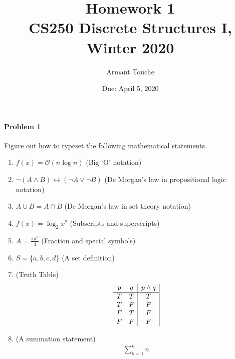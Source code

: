 \documentclass[11pt, a4paper]{article}
\title{\bf Homework 1\\[1ex]
\rm\normalsize CS250 Discrete Structures I, Winter 2020 }
\date{\normalsize Due: April 5, 2020}
\author{\normalsize Armant Touche}
\begin{document}
 

\vspace{0cm}\maketitle 

\paragraph{Problem 1} Figure out how to typeset the following mathematical statements.

\begin{enumerate}

    \item $f(x) =  \mathcal{O}(n \log n)$ (Big `O' notation)

    \item $\neg(A \land B) \leftrightarrow (\neg A \lor \neg B)$ (De Morgan's law in propositional logic notation)

    \item $\overline{A \cup B} = \overline{A} \cap \overline{B}$ (De Morgan's law in set theory notation)

    \item $f(x) = \log_{2} x^{2}$ (Subscripts and superscripts)

    \item $A = \frac{\pi d^2}{4}$ (Fraction and special symbols)

    \item $S = \{a, b, c, d\}$ (A set definition)

    \item (Truth Table)
        \begin{align*} 
			\begin{array}{|c c|c|} 
			p & q & p \land q\\ 
			\hline 			
            T & T & T\\
			T & F & F\\
			F & T & F\\
			F & F & F\\
			\end{array}
        \end{align*}
    \item (A summation statement)
		\begin{align*}
			\sum_{k=1}^{n}n 
		\end{align*}

\end{enumerate}
\end{document}
